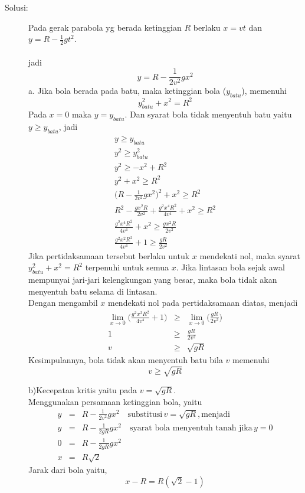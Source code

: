 \begin{description}
\item[Solusi:]
Pada gerak parabola yg berada ketinggian $R$ berlaku $x=v t$ dan $y= R-\frac{1}{2}g t^{2}$.\\ \\
jadi 
	\[y=R-\frac{1}{2 v^{2}} g x^{2}
\]
a. Jika bola berada pada batu, maka ketinggian bola ($y_{batu}$), memenuhi
	\[y^{2}_{batu} +x^{2}=R^{2}
\]
Pada $x=0$ maka $y=y_{batu}$. Dan syarat bola tidak menyentuh batu yaitu $y \ge y_{batu} $, jadi
\begin{eqnarray*}
y \ge y_{batu} \\
y^{2} \ge y^{2}_{batu} \\
y^{2} \ge -x^{2} + R^{2} \\
y^{2} +x^2 \ge R^{2} \\
\big(R-\frac{1}{2 v^{2}} g x^{2}\big)^{2} + x^{2} \ge R^{2} \\
R^{2} -\frac{g x^{2} R}{2 v^{2}}+ \frac{g^{2} x^{4} R^{2}}{4 v^{4}} +x^{2} \ge R^{2} \\
\frac{g^{2} x^{4} R^{2}}{4 v^{4}} +x^{2} \ge \frac{g x^{2} R}{2 v^{2}} \\
\frac{g^{2} x^{2} R^{2}}{4 v^{4}} +1 \ge \frac{g  R}{2 v^{2}}
\end{eqnarray*}
Jika pertidaksamaan tersebut berlaku untuk $x$ mendekati nol, maka syarat $y^{2}_{batu} +x^{2}=R^{2}$ terpenuhi untuk semua $x$. Jika lintasan bola sejak awal mempunyai jari-jari kelengkungan yang besar, maka bola tidak akan menyentuh batu selama di lintasan.\\
Dengan mengambil $x$ mendekati nol pada pertidaksamaan diatas, menjadi
\begin{eqnarray*}
	\lim_{x\rightarrow 0} \big(\frac{g^{2} x^{2} R^{2}}{4 v^{4}} +1\big) &\ge& \lim_{x\rightarrow 0} \big(\frac{g  R}{2 v^{2}} \big) \\
	1 &\ge& \frac{g  R}{2 v^{2}} \\
	v &\ge& \sqrt{g R}
\end{eqnarray*}
Kesimpulannya, bola tidak akan menyentuh batu bila $v$ memenuhi
\begin{equation*}
v \ge \sqrt{g R}
\end{equation*}  

b)Kecepatan kritis yaitu pada $v = \sqrt{g R}$.\\
Menggunakan persamaan ketinggian bola, yaitu
\begin{eqnarray*}
y&=&R-\frac{1}{2 v^{2}} g x^{2} \quad \textrm{substitusi} \,v=\sqrt{g R}, \textrm{menjadi} \\
y&=&R-\frac{1}{2 g R} g x^{2} \quad \textrm{syarat bola menyentuh tanah jika} \, y=0 \\
0&=&R-\frac{1}{2 g R} g x^{2} \\
x&=&R\sqrt{2}
\end{eqnarray*}
Jarak dari bola yaitu, 
\begin{equation*}
x-R=R(\sqrt{2}-1)
\end{equation*}
\end{description}

